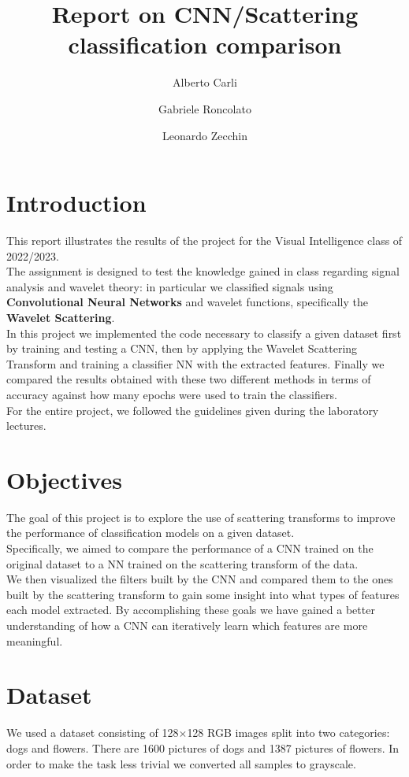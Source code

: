 \documentclass{report}
\title{Report on CNN/Scattering classification comparison}
\author{Alberto Carli \and Gabriele Roncolato \and Leonardo Zecchin }
\date{}
\begin{document}
\maketitle
\tableofcontents
\pagebreak

\chapter{Introduction}
This report illustrates the results of the project for the Visual Intelligence class of 2022/2023. \\
The assignment is designed to test the knowledge gained in class regarding signal analysis and wavelet theory: in particular we classified signals using \textbf{Convolutional Neural Networks} and wavelet functions, specifically the \textbf{Wavelet Scattering}. \\
In this project we implemented the code necessary to classify a given dataset first by training and testing a CNN, then by applying the Wavelet Scattering Transform and training a classifier NN with the extracted features.
Finally we compared the results obtained with these two different methods in terms of accuracy against how many epochs were used to train the classifiers. \\
For the entire project, we followed the guidelines given during the laboratory lectures.


\chapter{Objectives}
The goal of this project is to explore the use of scattering transforms to improve the performance of classification models on a given dataset.\\
Specifically, we aimed to compare the performance of a CNN trained on the original dataset to a NN trained on the scattering transform of the data.\\

We then visualized the filters built by the CNN and compared them to the ones built by the scattering transform to gain some insight into what types of features each model extracted.
By accomplishing these goals we have gained a better understanding of how a CNN can iteratively learn which features are more meaningful.

\chapter{Dataset}
We used a dataset consisting of 128$\times$128 RGB images split into two categories: dogs and flowers. There are 1600 pictures of dogs and 1387 pictures of flowers.
In order to make the task less trivial we converted all samples to grayscale.
\end{document}
